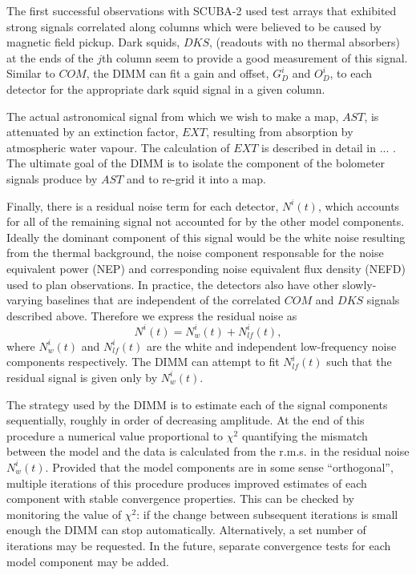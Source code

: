 \documentclass[twoside,11pt]{article}
\renewcommand{\_}{\texttt{\symbol{95}}}
\begin{document}
The first successful observations with SCUBA-2 used test arrays that
exhibited strong signals correlated along columns which were believed
to be caused by magnetic field pickup. Dark squids, $DKS$, (readouts
with no thermal absorbers) at the ends of the $j$th column seem to
provide a good measurement of this signal. Similar to $COM$, the DIMM
can fit a gain and offset, $G_D^i$ and $O_D^i$, to each detector for
the appropriate dark squid signal in a given column.

The actual astronomical signal from which we wish to make a map,
$AST$, is attenuated by an extinction factor, $EXT$, resulting from
absorption by atmospheric water vapour. The calculation of $EXT$ is
described in detail in ... . The ultimate goal of the DIMM is to
isolate the component of the bolometer signals produce by $AST$ and to
re-grid it into a map.

Finally, there is a residual noise term for each detector, $N^i(t)$,
which accounts for all of the remaining signal not accounted for by
the other model components. Ideally the dominant component of this
signal would be the white noise resulting from the thermal background,
the noise component responsable for the noise equivalent power (NEP)
and corresponding noise equivalent flux density (NEFD) used to plan
observations. In practice, the detectors also have other
slowly-varying baselines that are independent of the correlated $COM$
and $DKS$ signals described above. Therefore we express the residual
noise as
%
\begin{equation}
N^i(t) = N^i_w(t) + N^i_{lf}(t),
\label{eq:dimm_noise}
\end{equation}
%
where $N^i_w(t)$ and $N^i_{lf}(t)$ are the white and independent
low-frequency noise components respectively. The DIMM can attempt to
fit $N^i_{lf}(t)$ such that the residual signal is given only by
$N^i_w(t)$.

The strategy used by the DIMM is to estimate each of the signal
components sequentially, roughly in order of decreasing amplitude. At
the end of this procedure a numerical value proportional to $\chi^2$
quantifying the mismatch between the model and the data is calculated
from the r.m.s. in the residual noise $N^i_w(t)$. Provided that the
model components are in some sense ``orthogonal'', multiple iterations
of this procedure produces improved estimates of each component with
stable convergence properties. This can be checked by monitoring the
value of $\chi^2$: if the change between subsequent iterations is
small enough the DIMM can stop automatically. Alternatively, a set
number of iterations may be requested. In the future, separate
convergence tests for each model component may be added.
\end{document}

